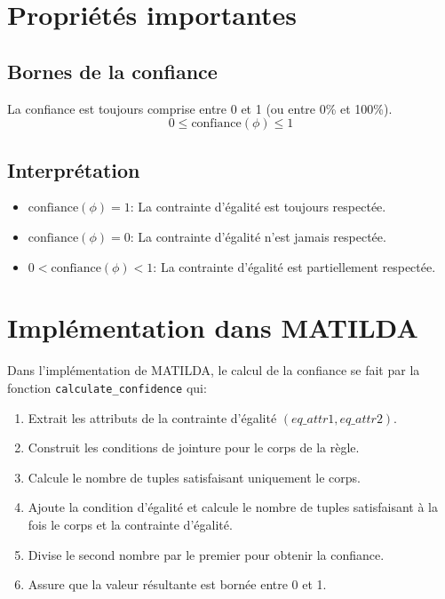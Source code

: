 \documentclass{article}
\begin{document}
\section{Propriétés importantes}

\subsection{Bornes de la confiance}
La confiance est toujours comprise entre 0 et 1 (ou entre 0\% et 100\%).
\begin{equation}
0 \leq \text{confiance}(\phi) \leq 1
\end{equation}

\subsection{Interprétation}

\begin{itemize}
    \item $\text{confiance}(\phi) = 1$: La contrainte d'égalité est toujours respectée.
    \item $\text{confiance}(\phi) = 0$: La contrainte d'égalité n'est jamais respectée.
    \item $0 < \text{confiance}(\phi) < 1$: La contrainte d'égalité est partiellement respectée.
\end{itemize}

\section{Implémentation dans MATILDA}

Dans l'implémentation de MATILDA, le calcul de la confiance se fait par la fonction \texttt{calculate\_confidence} qui:

\begin{enumerate}
    \item Extrait les attributs de la contrainte d'égalité $(eq\_attr1, eq\_attr2)$.
    \item Construit les conditions de jointure pour le corps de la règle.
    \item Calcule le nombre de tuples satisfaisant uniquement le corps.
    \item Ajoute la condition d'égalité et calcule le nombre de tuples satisfaisant à la fois le corps et la contrainte d'égalité.
    \item Divise le second nombre par le premier pour obtenir la confiance.
    \item Assure que la valeur résultante est bornée entre 0 et 1.
\end{enumerate}
\end{document}

